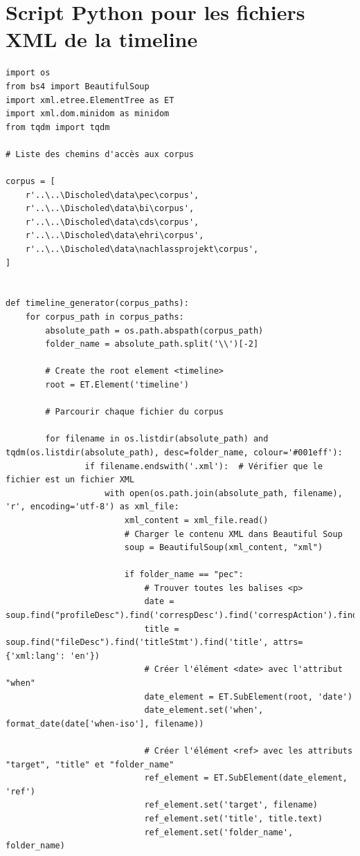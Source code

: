 \section{Script Python pour les fichiers XML de la timeline}
\label{script_python_timeline}
\begin{lstlisting}[style=pythonStyle, caption=script python pour générer les timeline.xml]
import os
from bs4 import BeautifulSoup
import xml.etree.ElementTree as ET
import xml.dom.minidom as minidom
from tqdm import tqdm

# Liste des chemins d'accès aux corpus

corpus = [
    r'..\..\Discholed\data\pec\corpus',
    r'..\..\Discholed\data\bi\corpus',
    r'..\..\Discholed\data\cds\corpus',
    r'..\..\Discholed\data\ehri\corpus',
    r'..\..\Discholed\data\nachlassprojekt\corpus',
]


def timeline_generator(corpus_paths):
    for corpus_path in corpus_paths:
        absolute_path = os.path.abspath(corpus_path)
        folder_name = absolute_path.split('\\')[-2]

        # Create the root element <timeline>
        root = ET.Element('timeline')

        # Parcourir chaque fichier du corpus

        for filename in os.listdir(absolute_path) and tqdm(os.listdir(absolute_path), desc=folder_name, colour='#001eff'):
                if filename.endswith('.xml'):  # Vérifier que le fichier est un fichier XML
                    with open(os.path.join(absolute_path, filename), 'r', encoding='utf-8') as xml_file:
                        xml_content = xml_file.read()
                        # Charger le contenu XML dans Beautiful Soup
                        soup = BeautifulSoup(xml_content, "xml")

                        if folder_name == "pec":
                            # Trouver toutes les balises <p>
                            date = soup.find("profileDesc").find('correspDesc').find('correspAction').find('date')
                            title = soup.find("fileDesc").find('titleStmt').find('title', attrs={'xml:lang': 'en'})
                            # Créer l'élément <date> avec l'attribut "when"
                            date_element = ET.SubElement(root, 'date')
                            date_element.set('when', format_date(date['when-iso'], filename))

                            # Créer l'élément <ref> avec les attributs "target", "title" et "folder_name"
                            ref_element = ET.SubElement(date_element, 'ref')
                            ref_element.set('target', filename)
                            ref_element.set('title', title.text)
                            ref_element.set('folder_name', folder_name)


\end{lstlisting}
